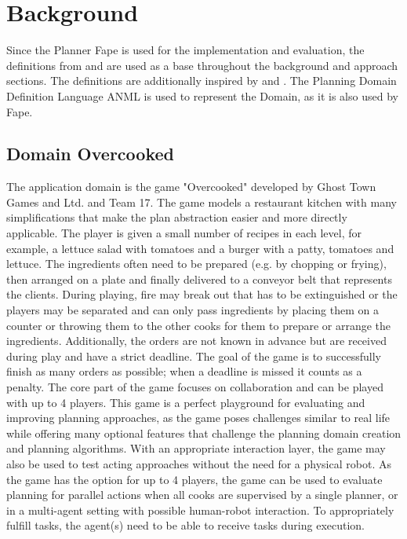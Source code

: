 \section{Background}\label{sec:background}

Since the Planner Fape \citep{bit-monnotFAPEConstraintbasedPlanner2020} is used for the implementation and evaluation, the definitions from \cite{bit-monnotTemporalHierarchicalModels2016a} and \cite{bit-monnotFAPEConstraintbasedPlanner2020} are used as a base throughout the background and approach sections.
The definitions are additionally inspired by \cite{ghallabAutomatedPlanningTheory2004} and \cite{hollerGuidingSearchHTN2019}.
The Planning Domain Definition Language ANML is used to represent the Domain, as it is also used by Fape.

\subsection{Domain Overcooked}

The application domain is the game "Overcooked" developed by Ghost Town Games and Ltd. and Team 17.
The game models a restaurant kitchen with many simplifications that make the plan abstraction easier and more directly applicable.
The player is given a small number of recipes in each level, for example, a lettuce salad with tomatoes and a burger with a patty, tomatoes and lettuce.
The ingredients often need to be prepared (e.g. by chopping or frying), then arranged on a plate and finally delivered to a conveyor belt that represents the clients.
During playing, fire may break out that has to be extinguished or the players may be separated and can only pass ingredients by placing them on a counter or throwing them to the other cooks for them to prepare or arrange the ingredients.
Additionally, the orders are not known in advance but are received during play and have a strict deadline.
The goal of the game is to successfully finish as many orders as possible; when a deadline is missed it counts as a penalty.
The core part of the game focuses on collaboration and can be played with up to 4 players.
This game is a perfect playground for evaluating and improving planning approaches, as the game poses challenges similar to real life while offering many optional features that challenge the planning domain creation and planning algorithms.
With an appropriate interaction layer, the game may also be used to test acting approaches without the need for a physical robot.
As the game has the option for up to 4 players, the game can be used to evaluate planning for parallel actions when all cooks are supervised by a single planner, or in a multi-agent setting with possible human-robot interaction.
To appropriately fulfill tasks, the agent(s) need to be able to receive tasks during execution.

